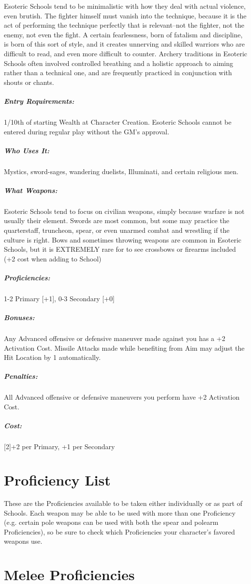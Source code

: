 \documentclass[oneside,11pt,english]{book}
\begin{document}
Esoteric Schools tend to be minimalistic with how they deal with actual violence, even brutish. The 
fighter himself must vanish into the technique, because it is the act of performing the technique perfectly 
that is relevant--not the fighter, not the enemy, not even the fight. A certain fearlessness, born of fatalism 
and discipline, is born of this sort of style, and it creates unnerving and skilled warriors who are difficult 
to read, and even more difficult to counter. Archery traditions in Esoteric Schools often involved 
controlled breathing and a holistic approach to aiming rather than a technical one, and are frequently 
practiced in conjunction with shouts or chants. 
\subparagraph{Entry Requirements:} 1/10th of starting Wealth at Character Creation. Esoteric Schools cannot be entered during regular play without the GM’s approval.
\subparagraph{Who Uses It:} Mystics, sword-sages, wandering duelists, Illuminati, and certain religious men. 
\subparagraph{What Weapons:} Esoteric Schools tend to focus on civilian weapons, simply because warfare is not 
usually their element. Swords are most common, but some may practice the quarterstaff, truncheon, spear, 
or even unarmed combat and wrestling if the culture is right. Bows and sometimes throwing weapons are 
common in Esoteric Schools, but it is EXTREMELY rare for to see crossbows or firearms included (+2 
cost when adding to School) 
\subparagraph{Proficiencies:} 1-2 Primary [+1], 0-3 Secondary [+0] 
\subparagraph{Bonuses:} Any Advanced offensive or defensive maneuver made against you has a +2 Activation Cost. 
Missile Attacks made while benefiting from Aim may adjust the Hit Location by 1 automatically. 
\subparagraph{Penalties:} All Advanced offensive or defensive maneuvers you perform have +2 Activation Cost. 
\subparagraph{Cost:} [2]+2 per Primary, +1 per Secondary 

\section*{Proficiency List}
These are the Proficiencies available to be taken either individually or as part of Schools. Each weapon 
may be able to be used with more than one Proficiency (e.g. certain pole weapons can be used with both 
the spear and polearm Proficiencies), so be sure to check which Proficiencies your character’s favored 
weapons use.

\section{Melee Proficiencies}
\end{document}
